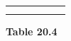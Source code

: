 {{\begin{center}
\begin{xtabular}[t]{|l|l|l|l|l|l|}
    
         &
    
    
         &
    
    
     \tabularnewline{}
    
    
         &
    
    
         &
    
    
         &
    
    
         &
    
    
         &
    
    
     \tabularnewline{}
    \end{xtabular}
      \end{center}
    \begin{center}{\small\bfseries Table 20.4}\end{center}
    
}}
